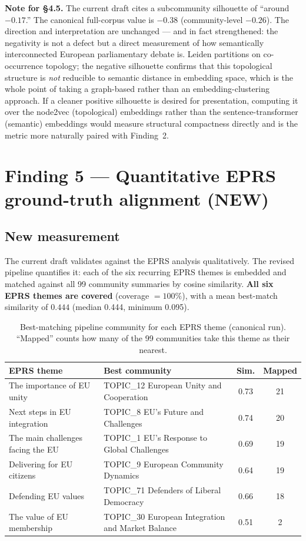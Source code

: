 \documentclass[11pt]{article}
\begin{document}
\begin{draftbox}
\textbf{Note for \S4.5.} The current draft cites a subcommunity silhouette of ``around $-0.17$.'' The canonical full-corpus value is $-0.38$ (community-level $-0.26$). The direction and interpretation are unchanged --- and in fact strengthened: the negativity is not a defect but a direct measurement of how semantically interconnected European parliamentary debate is. Leiden partitions on co-occurrence topology; the negative silhouette confirms that this topological structure is \emph{not} reducible to semantic distance in embedding space, which is the whole point of taking a graph-based rather than an embedding-clustering approach. If a cleaner positive silhouette is desired for presentation, computing it over the node2vec (topological) embeddings rather than the sentence-transformer (semantic) embeddings would measure structural compactness directly and is the metric more naturally paired with Finding~2.
\end{draftbox}

\clearpage
\section{Finding 5 --- Quantitative EPRS ground-truth alignment (NEW)}

\subsection*{New measurement}
The current draft validates against the EPRS analysis qualitatively. The revised pipeline quantifies it: each of the six recurring EPRS themes is embedded and matched against all 99 community summaries by cosine similarity. \textbf{All six EPRS themes are covered} (coverage $=100\%$), with a mean best-match similarity of $\mathbf{0.444}$ (median 0.444, minimum 0.095).

\begin{table}[h]
\centering
\small
\caption{Best-matching pipeline community for each EPRS theme (canonical run). ``Mapped'' counts how many of the 99 communities take this theme as their nearest.}
\begin{tabular}{p{4.3cm}p{5.2cm}cc}
\toprule
\textbf{EPRS theme} & \textbf{Best community} & \textbf{Sim.} & \textbf{Mapped} \\
\midrule
The importance of EU unity     & TOPIC\_12 European Unity and Cooperation      & 0.73 & 21 \\
Next steps in EU integration   & TOPIC\_8 EU's Future and Challenges            & 0.74 & 20 \\
The main challenges facing the EU & TOPIC\_1 EU's Response to Global Challenges  & 0.69 & 19 \\
Delivering for EU citizens     & TOPIC\_9 European Community Dynamics           & 0.64 & 19 \\
Defending EU values            & TOPIC\_71 Defenders of Liberal Democracy       & 0.66 & 18 \\
The value of EU membership     & TOPIC\_30 European Integration and Market Balance & 0.51 & 2 \\
\bottomrule
\end{tabular}
\end{table}
\end{document}
